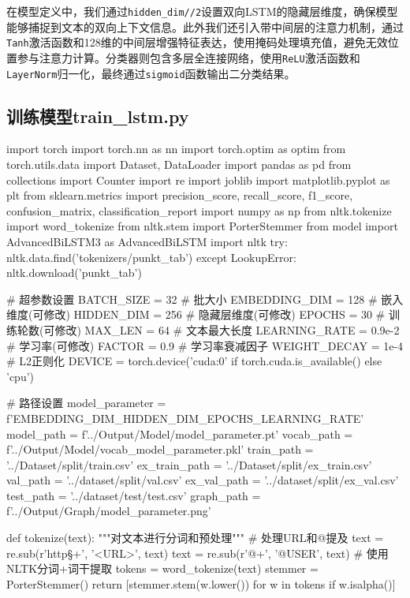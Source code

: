 在模型定义中，我们通过\verb|hidden_dim//2|设置双向LSTM的隐藏层维度，确保模型能够捕捉到文本的双向上下文信息。此外我们还引入带中间层的注意力机制，通过\verb|Tanh|激活函数和128维的中间层增强特征表达，使用掩码处理填充值，避免无效位置参与注意力计算。分类器则包含多层全连接网络，使用\verb|ReLU|激活函数和\verb|LayerNorm|归一化，最终通过\verb|sigmoid|函数输出二分类结果。

\vspace{1em}
\subsection{训练模型train\_lstm.py}
\begin{codeblock}[language=Python]
import torch
import torch.nn as nn
import torch.optim as optim
from torch.utils.data import Dataset, DataLoader
import pandas as pd
from collections import Counter
import re
import joblib
import matplotlib.pyplot as plt
from sklearn.metrics import precision_score, recall_score, f1_score, confusion_matrix, classification_report
import numpy as np
from nltk.tokenize import word_tokenize
from nltk.stem import PorterStemmer
from model import AdvancedBiLSTM3 as AdvancedBiLSTM
import nltk
try:
    nltk.data.find('tokenizers/punkt_tab')
except LookupError:
    nltk.download('punkt_tab')

# 超参数设置
BATCH_SIZE = 32         # 批大小
EMBEDDING_DIM = 128     # 嵌入维度(可修改)
HIDDEN_DIM = 256        # 隐藏层维度(可修改)
EPOCHS = 30             # 训练轮数(可修改)
MAX_LEN = 64            # 文本最大长度
LEARNING_RATE = 0.9e-2  # 学习率(可修改)
FACTOR = 0.9            # 学习率衰减因子
WEIGHT_DECAY = 1e-4     # L2正则化
DEVICE = torch.device('cuda:0' if torch.cuda.is_available() else 'cpu') 

# 路径设置
model_parameter = f'{EMBEDDING_DIM}_{HIDDEN_DIM}_{EPOCHS}_{LEARNING_RATE}'
model_path = f'../Output/Model/{model_parameter}.pt'
vocab_path = f'../Output/Model/vocab_{model_parameter}.pkl'
train_path = '../Dataset/split/train.csv'
ex_train_path = '../Dataset/split/ex_train.csv'
val_path = '../dataset/split/val.csv'
ex_val_path = '../dataset/split/ex_val.csv'
test_path = '../dataset/test/test.csv'
graph_path = f'../Output/Graph/{model_parameter}.png'

def tokenize(text):
    """对文本进行分词和预处理"""
    # 处理URL和@提及
    text = re.sub(r'http\S+', '<URL>', text)
    text = re.sub(r'@\w+', '@USER', text)
    # 使用NLTK分词+词干提取
    tokens = word_tokenize(text)
    stemmer = PorterStemmer()
    return [stemmer.stem(w.lower()) for w in tokens if w.isalpha()]


\end{codeblock}
